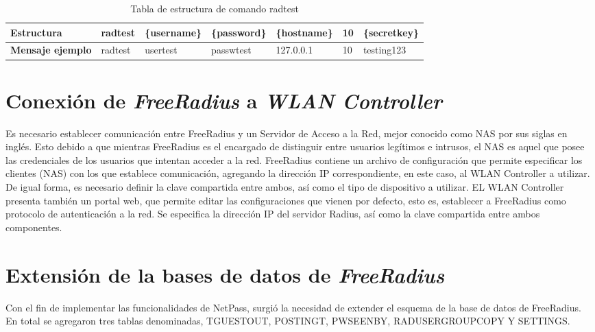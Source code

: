 \begin{table}[H]
\begin{tabular}{ p{4cm} p{} p{} p{} p{} p{} p{} }
\hline 
\footnotesize \bfseries {Estructura} &\footnotesize  radtest &\footnotesize \{username\}       &\footnotesize \{password\} &\footnotesize \{hostname\} &\footnotesize 10   &\footnotesize \{secretkey\} \\
\hline
\footnotesize \bfseries {Mensaje ejemplo} &\footnotesize  radtest &\footnotesize usertest &\footnotesize passwtest &\footnotesize 127.0.0.1 &\footnotesize 10 &\footnotesize testing123 \\
\hline
 
\end{tabular}
\footnotesize \caption{Tabla de estructura de comando radtest}
\label{table:radtest}
\end{table}
 
		
\section{Conexión de \textit{FreeRadius} a \textit{WLAN Controller}} \label{sect:Conexion de FreeRadius a WLAN Controller}
		Es necesario establecer comunicación entre FreeRadius y un Servidor de Acceso a la Red, mejor conocido como NAS por sus siglas en inglés. Esto debido a que mientras FreeRadius es el encargado de distinguir entre usuarios legítimos e intrusos, el NAS es aquel que posee las credenciales de los usuarios que intentan acceder a la red.
\newline
\newline
\indent FreeRadius contiene un archivo de configuración que permite especificar los clientes (NAS) con los que establece comunicación, agregando la dirección IP correspondiente, en este caso, al WLAN Controller a utilizar. De igual forma, es necesario definir la clave compartida entre ambos, así como el tipo de dispositivo a utilizar.
\newline
\newline
\indent EL WLAN Controller presenta también un portal web, que permite editar las configuraciones que vienen por defecto, esto es, establecer a FreeRadius como protocolo de autenticación a la red. Se especifica la dirección IP del servidor Radius, así como la clave compartida entre ambos componentes.

\section{Extensión de la bases de datos de \textit{FreeRadius}} \label{sect:Extension de la bases de datos de FreeRadius}
		Con el fin de implementar las funcionalidades de NetPass, surgió la necesidad de extender el esquema de la base de datos de FreeRadius. En total se agregaron tres tablas denominadas, TGUESTOUT, POSTINGT, PWSEENBY, RADUSERGROUPCOPY Y SETTINGS.
\newline		
		
